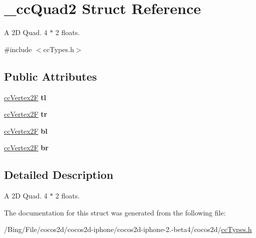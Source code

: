 \hypertarget{struct__cc_quad2}{\section{\-\_\-cc\-Quad2 Struct Reference}
\label{struct__cc_quad2}
}


A 2\-D Quad. 4 $\ast$ 2 floats.  




{\ttfamily \#include $<$cc\-Types.\-h$>$}

\subsection*{Public Attributes}
\begin{DoxyCompactItemize}
\item 
\hypertarget{struct__cc_quad2_a90515a91732078d94eebd8cb20efdedf}{\hyperlink{cc_types_8h_a3d0a9a02a1f9787a9ede91b9a74bf41f}{cc\-Vertex2\-F} {\bfseries tl}}\label{struct__cc_quad2_a90515a91732078d94eebd8cb20efdedf}

\item 
\hypertarget{struct__cc_quad2_a9c3b98cc3b55a3bb054f2b3dbb111dc0}{\hyperlink{cc_types_8h_a3d0a9a02a1f9787a9ede91b9a74bf41f}{cc\-Vertex2\-F} {\bfseries tr}}\label{struct__cc_quad2_a9c3b98cc3b55a3bb054f2b3dbb111dc0}

\item 
\hypertarget{struct__cc_quad2_a4a75f9e5d9aed039cd5e1bd6f9942a75}{\hyperlink{cc_types_8h_a3d0a9a02a1f9787a9ede91b9a74bf41f}{cc\-Vertex2\-F} {\bfseries bl}}\label{struct__cc_quad2_a4a75f9e5d9aed039cd5e1bd6f9942a75}

\item 
\hypertarget{struct__cc_quad2_ac06119d8e298bff04585f46e443b1e7b}{\hyperlink{cc_types_8h_a3d0a9a02a1f9787a9ede91b9a74bf41f}{cc\-Vertex2\-F} {\bfseries br}}\label{struct__cc_quad2_ac06119d8e298bff04585f46e443b1e7b}

\end{DoxyCompactItemize}


\subsection{Detailed Description}
A 2\-D Quad. 4 $\ast$ 2 floats. 

The documentation for this struct was generated from the following file\-:\begin{DoxyCompactItemize}
\item 
/\-Bing/\-File/cocos2d/cocos2d-\/iphone/cocos2d-\/iphone-\/2.-\/beta4/cocos2d/\hyperlink{cc_types_8h}{cc\-Types.\-h}\end{DoxyCompactItemize}
